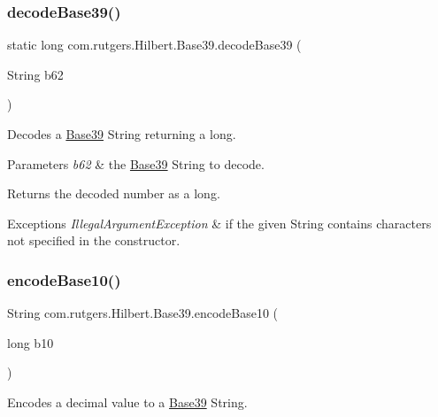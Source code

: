 \subsubsection{\texorpdfstring{decode\+Base39()}{decodeBase39()}}
{\footnotesize\ttfamily static long com.\+rutgers.\+Hilbert.\+Base39.\+decode\+Base39 (\begin{DoxyParamCaption}\item[{String}]{b62 }\end{DoxyParamCaption})\hspace{0.3cm}{\ttfamily [static]}}

Decodes a \hyperlink{classcom_1_1rutgers_1_1Hilbert_1_1Base39}{Base39} {\ttfamily String} returning a {\ttfamily long}.


\begin{DoxyParams}{Parameters}
{\em b62} & the \hyperlink{classcom_1_1rutgers_1_1Hilbert_1_1Base39}{Base39} {\ttfamily String} to decode. \\
\hline
\end{DoxyParams}
\begin{DoxyReturn}{Returns}
the decoded number as a {\ttfamily long}. 
\end{DoxyReturn}

\begin{DoxyExceptions}{Exceptions}
{\em Illegal\+Argument\+Exception} & if the given {\ttfamily String} contains characters not specified in the constructor. \\
\hline
\end{DoxyExceptions}
\mbox{\label{classcom_1_1rutgers_1_1Hilbert_1_1Base39_a042a8fe52c1e68fcbde5bcb10f9cae5e}} 
\subsubsection{\texorpdfstring{encode\+Base10()}{encodeBase10()}}
{\footnotesize\ttfamily String com.\+rutgers.\+Hilbert.\+Base39.\+encode\+Base10 (\begin{DoxyParamCaption}\item[{long}]{b10 }\end{DoxyParamCaption})}

Encodes a decimal value to a \hyperlink{classcom_1_1rutgers_1_1Hilbert_1_1Base39}{Base39} {\ttfamily String}.


